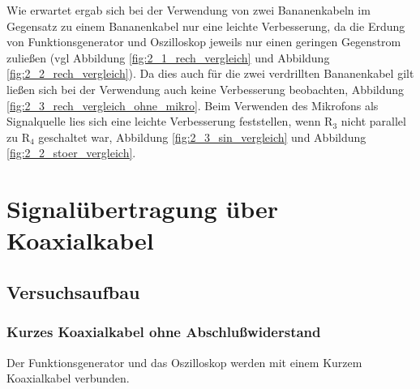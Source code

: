 \documentclass[12pt,a4paper]{article}
\begin{document}
Wie erwartet ergab sich bei der Verwendung von zwei Bananenkabeln im Gegensatz zu einem Bananenkabel nur eine leichte Verbesserung, da die Erdung von Funktionsgenerator und Oszilloskop jeweils nur einen geringen Gegenstrom zuließen (vgl Abbildung \ref{fig:2_1_rech_vergleich} und Abbildung \ref{fig:2_2_rech_vergleich}).
Da dies auch für die zwei verdrillten Bananenkabel gilt ließen sich bei der Verwendung auch keine Verbesserung beobachten, Abbildung \ref{fig:2_3_rech_vergleich_ohne_mikro}. Beim Verwenden des Mikrofons als Signalquelle lies sich eine leichte Verbesserung feststellen, wenn R$_3$ nicht parallel zu R$_4$ geschaltet war, Abbildung \ref{fig:2_3_sin_vergleich} und Abbildung \ref{fig:2_2_stoer_vergleich}.


\section{Signalübertragung über Koaxialkabel}
\subsection{Versuchsaufbau}


\subsubsection{Kurzes Koaxialkabel ohne Abschlußwiderstand}

Der Funktionsgenerator und das Oszilloskop werden mit einem Kurzem Koaxialkabel verbunden.
\end{document}
